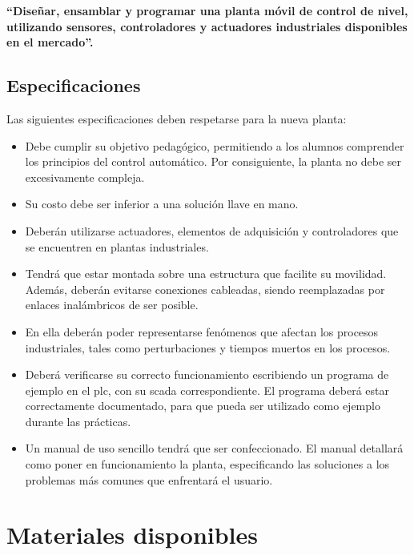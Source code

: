 \textbf{``Diseñar, ensamblar y programar una planta móvil de control de nivel,
utilizando sensores, controladores y actuadores industriales disponibles en el
mercado''.}

\subsection{Especificaciones}
\label{subsec:especificaciones}

Las siguientes especificaciones deben respetarse para la nueva planta:

\begin{itemize}
\item Debe cumplir su objetivo pedagógico, permitiendo
 a los alumnos comprender los principios del control automático.
 Por consiguiente, la planta no debe ser excesivamente compleja.
 \item Su costo debe ser inferior a una solución llave en mano.
 \item Deberán utilizarse actuadores, elementos de adquisición
 y controladores que se encuentren en plantas industriales.
 \item Tendrá que estar montada sobre una estructura que facilite su
movilidad. Además, deberán evitarse conexiones cableadas, siendo reemplazadas
por enlaces inalámbricos de ser posible.
 \item En ella deberán poder representarse fenómenos que
afectan los procesos industriales, tales como perturbaciones y
tiempos muertos en los procesos.
 \item Deberá verificarse su correcto funcionamiento escribiendo un programa de
ejemplo en el \gls{plc}, con su \gls{scada} correspondiente.
El programa deberá estar correctamente documentado, para que pueda ser
utilizado como ejemplo durante las prácticas.
 \item Un manual de uso sencillo tendrá que ser confeccionado.
 El manual detallará como poner en funcionamiento la planta, especificando las
soluciones a los problemas más comunes que enfrentará el usuario.
\end{itemize}

\section{Materiales disponibles}
\label{sec:MaterialesDisponibles}

